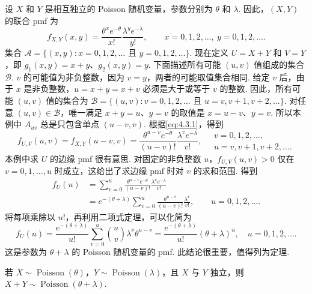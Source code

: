 \begin{example}\label{ex:4.3.1}
设 $X$ 和 $Y$ 是相互独立的 Poisson 随机变量，参数分别为 $\theta$ 和 $\lambda$. 因此，$(X,Y)$ 的联合 pmf 为
$$f_{X,Y}(x,y)=\frac{\theta^xe^{-\theta}}{x!}\frac{\lambda^ye^{-\lambda}}{y!},\qquad x=0,1,2,\ldots,\ y=0,1,2,\ldots.$$
集合 $\mathscr A=\{(x,y):x=0,1,2,\ldots\text{ 且 }y=0,1,2,\ldots\}$. 现在定义 $U=X+Y$ 和 $V=Y$，即 $g_1(x,y)=x+y$、$g_2(x,y)=y$. 下面描述所有可能 $(u,v)$ 值组成的集合 $\mathscr B$. $v$ 的可能值为非负整数，因为 $v=y$，两者的可能取值集合相同. 给定 $v$ 后，由于 $x$ 是非负整数，$u=x+y=x+v$ 必须是大于或等于 $v$ 的整数. 因此，所有可能 $(u,v)$ 值的集合为 $\mathscr B=\{(u,v):v=0,1,2,\ldots\text{ 且 }u=v,v+1,v+2,\ldots\}$. 对任意 $(u,v)\in\mathscr B$，唯一满足 $x+y=u$、$y=v$ 的取值是 $x=u-v$、$y=v$. 所以本例中 $A_{uv}$ 总是只包含单点 $(u-v,v)$. 根据\eqref{eq:4.3.1}，得到
$$f_{U,V}(u,v)=f_{X,Y}(u-v,v)=\frac{\theta^{u-v}e^{-\theta}}{(u-v)!}\frac{\lambda^ve^{-\lambda}}{v!},\quad
\begin{matrix}v=0,1,2,\ldots,\\u=v,v+1,v+2,\ldots.\end{matrix}$$
本例中求 $U$ 的边缘 pmf 很有意思. 对固定的非负整数 $u$，$f_{U,V}(u,v)>0$ 仅在 $v=0,1,\ldots,u$ 时成立，这给出了求边缘 pmf 时对 $v$ 的求和范围. 得到
$$
\begin{aligned}
f_U(u)&=\sum_{v=0}^u\frac{\theta^{u-v}e^{-\theta}}{(u-v)!}\frac{\lambda^ve^{-\lambda}}{v!}\\
&=e^{-(\theta+\lambda)}\sum_{v=0}^u\frac{\theta^{u-v}}{(u-v)!}\frac{\lambda^v}{v!},\qquad u=0,1,2,\ldots.
\end{aligned}
$$
将每项乘除以 $u!$，再利用二项式定理，可以化简为
$$f_U(u)=\frac{e^{-(\theta+\lambda)}}{u!}\sum_{v=0}^u\binom uv\lambda^v\theta^{u-v}
=\frac{e^{-(\theta+\lambda)}}{u!}(\theta+\lambda)^u,\quad u=0,1,2,\ldots.$$
这是参数为 $\theta+\lambda$ 的 Poisson 随机变量的 pmf. 此结论很重要，值得列为定理.
\end{example}
\begin{theorem}\label{thm:4.3.2}
若 $X\sim\operatorname{Poisson}(\theta)$，$Y\sim\operatorname{Poisson}(\lambda)$，且 $X$ 与 $Y$ 独立，则 $X+Y\sim\operatorname{Poisson}(\theta+\lambda)$.
\end{theorem}

